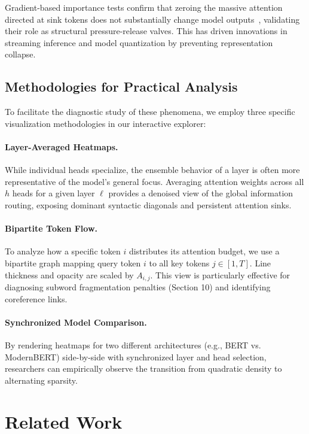 \documentclass[11pt]{article}
\begin{document}
Gradient-based importance tests confirm that zeroing the massive attention directed at sink tokens does not substantially change model outputs~\cite{xiao2023efficient}, validating their role as structural pressure-release valves. This has driven innovations in streaming inference and model quantization by preventing representation collapse.

\subsection{Methodologies for Practical Analysis}

To facilitate the diagnostic study of these phenomena, we employ three specific visualization methodologies in our interactive explorer:

\paragraph{Layer-Averaged Heatmaps.} \label{sec:average}
While individual heads specialize, the ensemble behavior of a layer is often more representative of the model's general focus. Averaging attention weights across all $h$ heads for a given layer $\ell$ provides a denoised view of the global information routing, exposing dominant syntactic diagonals and persistent attention sinks.

\paragraph{Bipartite Token Flow.} \label{sec:flow}
To analyze how a specific token $i$ distributes its attention budget, we use a bipartite graph mapping query token $i$ to all key tokens $j \in [1, T]$. Line thickness and opacity are scaled by $A_{i,j}$. This view is particularly effective for diagnosing subword fragmentation penalties (Section 10) and identifying coreference links.

\paragraph{Synchronized Model Comparison.}
By rendering heatmaps for two different architectures (e.g., BERT vs. ModernBERT) side-by-side with synchronized layer and head selection, researchers can empirically observe the transition from quadratic density to alternating sparsity.

\section{Related Work}
\end{document}

